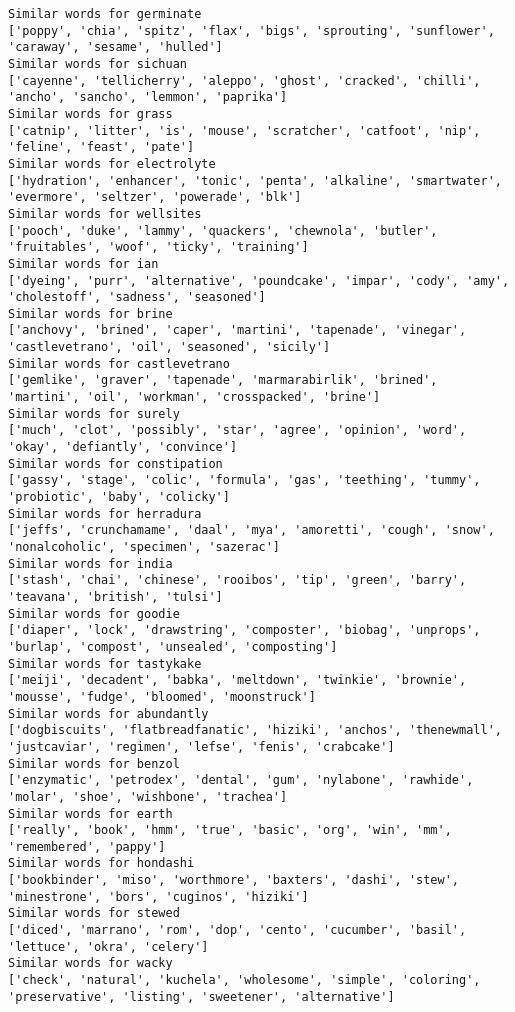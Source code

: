 \documentclass[11pt]{article}
\begin{document}
\begin{Verbatim}[commandchars=\\\{\}]
Similar words for germinate
['poppy', 'chia', 'spitz', 'flax', 'bigs', 'sprouting', 'sunflower', 'caraway', 'sesame', 'hulled']
Similar words for sichuan
['cayenne', 'tellicherry', 'aleppo', 'ghost', 'cracked', 'chilli', 'ancho', 'sancho', 'lemmon', 'paprika']
Similar words for grass
['catnip', 'litter', 'is', 'mouse', 'scratcher', 'catfoot', 'nip', 'feline', 'feast', 'pate']
Similar words for electrolyte
['hydration', 'enhancer', 'tonic', 'penta', 'alkaline', 'smartwater', 'evermore', 'seltzer', 'powerade', 'blk']
Similar words for wellsites
['pooch', 'duke', 'lammy', 'quackers', 'chewnola', 'butler', 'fruitables', 'woof', 'ticky', 'training']
Similar words for ian
['dyeing', 'purr', 'alternative', 'poundcake', 'impar', 'cody', 'amy', 'cholestoff', 'sadness', 'seasoned']
Similar words for brine
['anchovy', 'brined', 'caper', 'martini', 'tapenade', 'vinegar', 'castlevetrano', 'oil', 'seasoned', 'sicily']
Similar words for castlevetrano
['gemlike', 'graver', 'tapenade', 'marmarabirlik', 'brined', 'martini', 'oil', 'workman', 'crosspacked', 'brine']
Similar words for surely
['much', 'clot', 'possibly', 'star', 'agree', 'opinion', 'word', 'okay', 'defiantly', 'convince']
Similar words for constipation
['gassy', 'stage', 'colic', 'formula', 'gas', 'teething', 'tummy', 'probiotic', 'baby', 'colicky']
Similar words for herradura
['jeffs', 'crunchamame', 'daal', 'mya', 'amoretti', 'cough', 'snow', 'nonalcoholic', 'specimen', 'sazerac']
Similar words for india
['stash', 'chai', 'chinese', 'rooibos', 'tip', 'green', 'barry', 'teavana', 'british', 'tulsi']
Similar words for goodie
['diaper', 'lock', 'drawstring', 'composter', 'biobag', 'unprops', 'burlap', 'compost', 'unsealed', 'composting']
Similar words for tastykake
['meiji', 'decadent', 'babka', 'meltdown', 'twinkie', 'brownie', 'mousse', 'fudge', 'bloomed', 'moonstruck']
Similar words for abundantly
['dogbiscuits', 'flatbreadfanatic', 'hiziki', 'anchos', 'thenewmall', 'justcaviar', 'regimen', 'lefse', 'fenis', 'crabcake']
Similar words for benzol
['enzymatic', 'petrodex', 'dental', 'gum', 'nylabone', 'rawhide', 'molar', 'shoe', 'wishbone', 'trachea']
Similar words for earth
['really', 'book', 'hmm', 'true', 'basic', 'org', 'win', 'mm', 'remembered', 'pappy']
Similar words for hondashi
['bookbinder', 'miso', 'worthmore', 'baxters', 'dashi', 'stew', 'minestrone', 'bors', 'cuginos', 'hiziki']
Similar words for stewed
['diced', 'marrano', 'rom', 'dop', 'cento', 'cucumber', 'basil', 'lettuce', 'okra', 'celery']
Similar words for wacky
['check', 'natural', 'kuchela', 'wholesome', 'simple', 'coloring', 'preservative', 'listing', 'sweetener', 'alternative']

\end{Verbatim}
\end{document}
